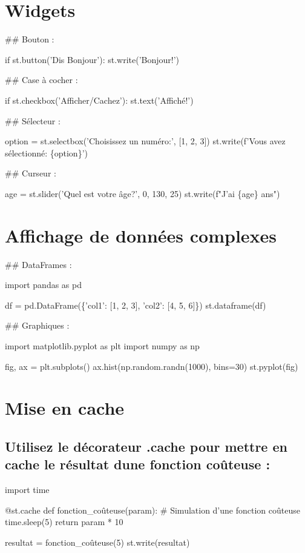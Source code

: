  \section*{Widgets}

\#\# Bouton \+: 
\begin{DoxyCode}
if st.button('Dis Bonjour'):
    st.write('Bonjour!')
\end{DoxyCode}
 \#\# Case à cocher \+: 
\begin{DoxyCode}
if st.checkbox('Afficher/Cachez'):
    st.text('Affiché!')
\end{DoxyCode}
 \#\# Sélecteur \+: 
\begin{DoxyCode}
option = st.selectbox('Choisissez un numéro:', [1, 2, 3])
st.write(f'Vous avez sélectionné: \{option\}')
\end{DoxyCode}
 \#\# Curseur \+: 
\begin{DoxyCode}
age = st.slider('Quel est votre âge?', 0, 130, 25)
st.write(f"J'ai \{age\} ans")
\end{DoxyCode}
 \section*{Affichage de données complexes}

\#\# Data\+Frames \+: 
\begin{DoxyCode}
import pandas as pd

df = pd.DataFrame(\{'col1': [1, 2, 3], 'col2': [4, 5, 6]\})
st.dataframe(df)
\end{DoxyCode}
 \#\# Graphiques \+: 
\begin{DoxyCode}
import matplotlib.pyplot as plt
import numpy as np

fig, ax = plt.subplots()
ax.hist(np.random.randn(1000), bins=30)
st.pyplot(fig)
\end{DoxyCode}
 \section*{Mise en cache}

\subsection*{Utilisez le décorateur .cache pour mettre en cache le résultat d\textquotesingle{}une fonction coûteuse \+:}


\begin{DoxyCode}
import time

@st.cache
def fonction\_coûteuse(param):
    # Simulation d'une fonction coûteuse
    time.sleep(5)
    return param * 10

resultat = fonction\_coûteuse(5)
st.write(resultat)
\end{DoxyCode}
